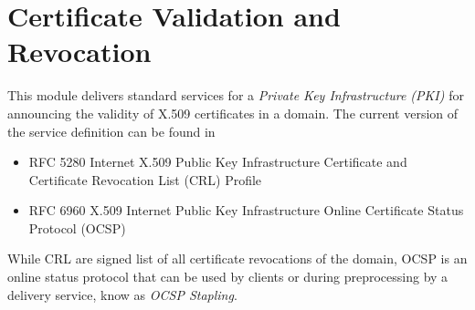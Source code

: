 \section{Certificate Validation and Revocation}

This module delivers standard services for a \emph{Private Key
Infrastructure (PKI)} for announcing the validity of X.509 certificates
in a domain. The current version of the service definition can be found
in 

\begin{itemize}
    \item RFC 5280 Internet X.509 Public Key Infrastructure Certificate
        and Certificate Revocation List (CRL) Profile
    \item RFC 6960 X.509 Internet Public Key Infrastructure Online
        Certificate Status Protocol (OCSP)
\end{itemize}

While CRL are signed list of all certificate revocations of the domain,
OCSP is an online status protocol that can be used by clients or 
during preprocessing by a delivery service, know as \emph{OCSP Stapling}.


